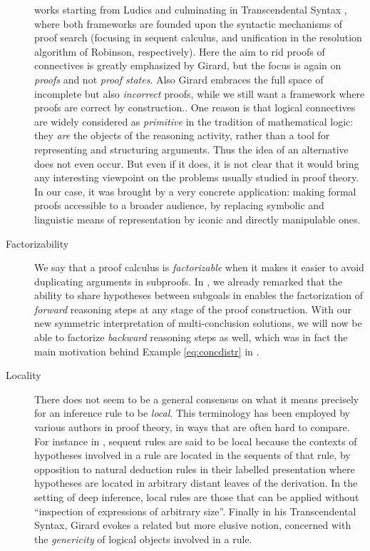 \begin{description}
{    works starting from Ludics \cite{girard_locus_2001} and culminating in
    Transcendental Syntax \cite{eng_exegesis_2023}, where both frameworks are
    founded upon the syntactic mechanisms of proof search (focusing in sequent
    calculus, and unification in the resolution algorithm of Robinson,
    respectively). Here the aim to rid proofs of connectives is greatly
    emphasized by Girard, but the focus is again on \emph{proofs} and not
    \emph{proof states}. Also Girard embraces the full space of incomplete but
    also \emph{incorrect} proofs, while we still want a framework where proofs
    are correct by construction.}. One reason is that logical connectives are
    widely considered as \emph{primitive} in the tradition of mathematical
    logic: they \emph{are} the objects of the reasoning activity, rather than a
    tool for representing and structuring arguments. Thus the idea of an
    alternative does not even occur. But even if it does, it is not clear that
    it would bring any interesting viewpoint on the problems usually studied in
    proof theory. In our case, it was brought by a very concrete application:
    making formal proofs accessible to a broader audience, by replacing symbolic
    and linguistic means of representation by iconic and directly manipulable
    ones.
  \item[Factorizability]
    We say that a proof calculus is \emph{factorizable} when it makes it easier
    to avoid duplicating arguments in subproofs. In , we
    already remarked that the ability to share hypotheses between subgoals in
     enables the factorization of \emph{forward} reasoning steps at any
    stage of the proof construction. With our new symmetric interpretation of
    multi-conclusion solutions, we will now be able to factorize \emph{backward}
    reasoning steps as well, which was in fact the main motivation behind
    Example \ref{eq:concdistr} in .
  \item[Locality]
    There does not seem to be a general consensus on what it means precisely for
    an inference rule to be \emph{local}. This terminology has been employed by
    various authors in proof theory, in ways that are often hard to compare. For
    instance in , sequent rules are said to be
    local because the contexts of hypotheses involved in a rule are located in
    the sequents of that rule, by opposition to natural deduction rules in their
    labelled presentation where hypotheses are located in arbitrary distant
    leaves of the derivation. In the setting of deep inference, local rules are
    those that can be applied without ``inspection of expressions of arbitrary
    size''. Finally in his Transcendental Syntax,
    Girard evokes a related but more elusive notion, concerned with the
    \emph{genericity} of logical objects involved in a rule.
    

\end{description}
